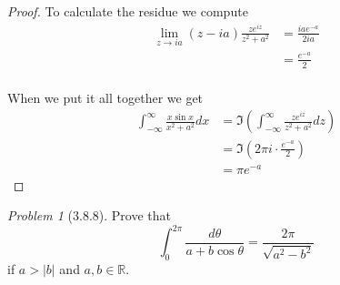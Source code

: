 \documentclass[10pt]{article}
\newcommand{\sk}{\vskip 10mm}
\newcommand{\bb}[1]{\mathbb{#1}}
\theoremstyle{remark}
\newtheorem{problem}{Problem}
\theoremstyle{remark}
\begin{document}
\begin{proof}
  To calculate the residue we compute
  \begin{align*}
    \lim_{z\rightarrow ia}(z-ia)\frac{ze^{iz}}{z^2+a^2}&=\frac{iae^{-a}}{2ia}\\
                                             &=\frac{e^{-a}}{2}\\
  \end{align*}

  When we put it all together we get
  \begin{align*}
    \int_{-\infty}^\infty\frac{x\sin x}{x^2+a^2}dx&=\Im\left(\int_{-\infty}^\infty\frac{ze^{iz}}{z^2+a^2} dz\right)\\
                                               &=\Im(2\pi i\cdot \frac{e^{-a}}{2})\\
                                               &=\pi e^{-a}
  \end{align*}
\end{proof}

\sk

\begin{problem}[3.8.8]
  Prove that
  \[
    \int_0^{2\pi}\frac{d\theta}{a+b\cos\theta}=\frac{2\pi}{\sqrt{a^2-b^2}}
  \]
  if $a>|b|$ and $a,b\in\bb{R}$.
\end{problem}
\end{document}
